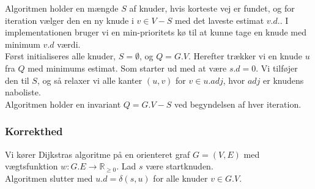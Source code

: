 Algoritmen holder en mængde $S$ af knuder, hvis korteste vej er fundet, og for iteration vælger den en ny knude i $v \in V-S$ med det laveste estimat $v.d.$. I implementationen bruger vi en min-prioritets kø til at kunne tage en knude med minimum $v.d$ værdi.\\

Først initialiseres alle knuder, $S = \emptyset$, og $Q=G.V$. Herefter trækker vi en knude $u$ fra $Q$ med minimums estimat. Som starter ud med at være $s.d = 0$. Vi tilføjer den til $S$, og så relaxer vi alle kanter $(u,v)$ for $v \in u.adj$, hvor $adj$ er knudens naboliste.\\
Algoritmen holder en invariant $Q = G.V-S$ ved begyndelsen af hver iteration.\\

\subsubsection{Korrekthed}
\begin{theorem}
  Vi kører Dijkstras algoritme på en orienteret graf $G = (V, E)$ med vægtsfunktion $w : G.E \rightarrow \mathbb{R}_{\geq 0}$. Lad $s$ være startknuden.\\
  Algoritmen slutter med $u.d = \delta(s,u)$ for alle knuder $v \in G.V$.
\end{theorem}

